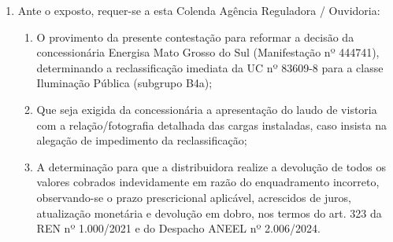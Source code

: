 \begin{enumerate}[resume]
\item Ante o exposto, requer-se a esta Colenda Agência Reguladora / Ouvidoria:
    \begin{enumerate}
    \item O provimento da presente contestação para reformar a decisão da concessionária Energisa Mato Grosso do Sul (Manifestação nº 444741), determinando a reclassificação imediata da UC nº 83609-8 para a classe Iluminação Pública (subgrupo B4a);
    \item Que seja exigida da concessionária a apresentação do laudo de vistoria com a relação/fotografia detalhada das cargas instaladas, caso insista na alegação de impedimento da reclassificação;
    \item A determinação para que a distribuidora realize a devolução de todos os valores cobrados indevidamente em razão do enquadramento incorreto, observando-se o prazo prescricional aplicável, acrescidos de juros, atualização monetária e devolução em dobro, nos termos do art. 323 da REN nº 1.000/2021 e do Despacho ANEEL nº 2.006/2024.
    \end{enumerate}
\end{enumerate}